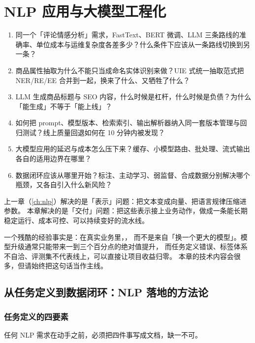 \chapter{NLP 应用与大模型工程化}
\label{ch:nlpapp}

\begin{insight}[本章要解决的问题]
\begin{enumerate}
  \item 同一个「评论情感分析」需求，FastText、BERT 微调、LLM 三条路线的准确率、单位成本与运维复杂度各差多少？什么条件下应该从一条路线切换到另一条？
  \item 商品属性抽取为什么不能只当成命名实体识别来做？UIE 式统一抽取范式把 NER/RE/EE 合并到一起，换来了什么、又牺牲了什么？
  \item LLM 生成商品标题与 SEO 内容，什么时候是杠杆，什么时候是负债？为什么「能生成」不等于「能上线」？
  \item 如何把 prompt、模型版本、检索索引、输出解析器纳入同一套版本管理与回归测试？线上质量回退如何在 10 分钟内被发现？
  \item 大模型应用的延迟与成本怎么压下来？缓存、小模型路由、批处理、流式输出各自的适用边界在哪里？
  \item 数据闭环应该从哪里开始？标注、主动学习、弱监督、合成数据分别解决哪个瓶颈，又各自引入什么新风险？
\end{enumerate}
\end{insight}

上一章（\cref{ch:nlp}）解决的是「表示」问题：把文本变成向量、把语言规律压缩进参数。
本章解决的是「交付」问题：把这些表示接上业务动作，做成一条能长期稳定运行、成本可控、可以持续变好的流水线。

一个残酷的经验事实是：在真实业务里，，
而不是来自「换一个更大的模型」。模型升级通常只能带来一到三个百分点的绝对值提升，
而任务定义错误、标签体系不自洽、评测集不代表线上，可以直接让项目收益归零。
本章的技术内容会很多，但请始终把这句话当作主线。

\section{从任务定义到数据闭环：NLP 落地的方法论}

\subsection{任务定义的四要素}

任何 NLP 需求在动手之前，必须把四件事写成文档，缺一不可。

